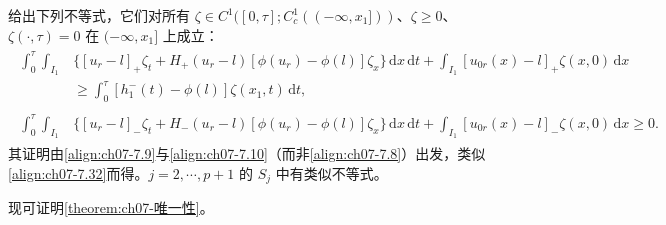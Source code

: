 \documentclass[../../main.tex]{subfiles}%
\begin{document}
\begin{remark}\label{remark:ch07-7.2.5}
给出下列不等式，它们对所有 $\zeta\in C^1([0,\tau];C^1_c((-\infty,x_1]))$、$\zeta\geqslant0$、$\zeta(\cdot,\tau)=0$ 在 $(-\infty,x_1]$ 上成立：
\begin{align}
\begin{aligned}
\int_0^\tau\int_{I_1}&\{[u_r-l]_+\zeta_t+H_+(u_r-l)[\phi(u_r)-\phi(l)]\zeta_x\}\,\mathrm{d}x\,\mathrm{d}t
+\int_{I_1}[u_{0r}(x)-l]_+\zeta(x,0)\,\mathrm{d}x\\
&\geqslant\int_0^\tau[h_1^-(t)-\phi(l)]\zeta(x_1,t)\,\mathrm{d}t,
\end{aligned} \label{align:ch07-7.33}
\end{align}
\begin{align}
\begin{aligned}
\int_0^\tau\int_{I_1}&\{[u_r-l]_-\zeta_t+H_-(u_r-l)[\phi(u_r)-\phi(l)]\zeta_x\}\,\mathrm{d}x\,\mathrm{d}t
+\int_{I_1}[u_{0r}(x)-l]_-\zeta(x,0)\,\mathrm{d}x\geqslant0.
\end{aligned} \label{align:ch07-7.34}
\end{align}
其证明由\eqref{align:ch07-7.9}与\eqref{align:ch07-7.10}（而非\eqref{align:ch07-7.8}）出发，类似\eqref{align:ch07-7.32}而得。$j=2,\cdots ,p+1$ 的 $S_j$ 中有类似不等式。
\end{remark}

现可证明\cref{theorem:ch07-唯一性}。
\end{document}
